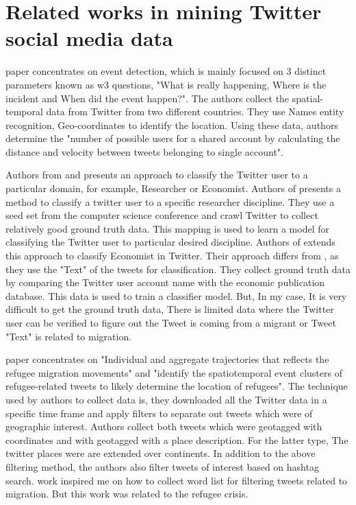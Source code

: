 


\section{Related works in mining Twitter social media data}




\cite{Goergen} paper concentrates on event detection, which is mainly focused on 3 distinct parameters
known as w3 questions, "What is really happening, Where is the incident and When did the
event happen?". The authors collect the spatial-temporal data from Twitter from two different
countries. They use Names entity recognition, Geo-coordinates to identify the location. Using these
data, authors determine the "number of possible users for a shared account by calculating the
distance and velocity between tweets belonging to single account".

 
Authors from \cite{Hadgu} and  \cite{Böhm2017} presents an approach to classify the Twitter user to a particular domain, for example, Researcher or Economist. Authors of \cite{Hadgu} presents a method to classify a twitter user to a specific researcher discipline. They use a seed set from the computer science conference and crawl Twitter to collect relatively good ground truth data. This mapping is used to learn a model for classifying the Twitter user to particular desired discipline. Authors of \cite{Böhm2017}  extends this approach to classify Economist in Twitter. Their approach differs from \cite{Hadgu}, as they use the "Text" of the tweets for classification. They collect ground truth data by comparing the Twitter user account name with the economic publication database. This data is used to train a classifier model. But, In my case, It is very difficult to get the ground truth data, There is limited data where the Twitter user can be verified to figure out the Tweet is coming from a migrant or Tweet "Text" is related to migration. 
 
\cite{Hübl} paper concentrates on "Individual and aggregate trajectories that reflects the refugee migration
movements" and "identify the spatiotemporal event clusters of refugee-related tweets to
likely determine the location of refugees". The technique used by authors to collect data is, they
downloaded all the Twitter data in a specific time frame and apply filters to separate out tweets
which were of geographic interest. Authors collect both tweets which were geotagged with coordinates
and with geotagged with a place description. For the latter type, The twitter places were
are extended over continents. In addition to the above filtering method, the authors also filter tweets
of interest based on hashtag search. \cite{Hübl} work inspired me on how to collect word list for filtering
tweets related to migration. But this work was related to the refugee crisis.
 
